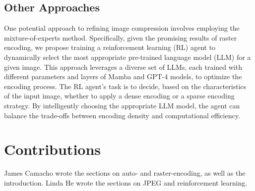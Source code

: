 \documentclass[11pt]{article}
\begin{document}
\subsection{Other Approaches}
One potential approach to refining image compression involves employing the mixture-of-experts method. Specifically, given the promising results of raster encoding, we propose training a reinforcement learning (RL) agent to dynamically select the most appropriate pre-trained language model (LLM) for a given image. This approach leverages a diverse set of LLMs, each trained with different parameters and layers of Mamba and GPT-4 models, to optimize the encoding process.
The RL agent's task is to decide, based on the characteristics of the input image, whether to apply a dense encoding or a sparse encoding strategy. By intelligently choosing the appropriate LLM model, the agent can balance the trade-offs between encoding density and computational efficiency. 

\section*{Contributions}
James Camacho wrote the sections on auto- and raster-encoding, as well as the introduction. Linda He wrote the sections on JPEG and reinforcement learning.

\newpage


\end{document}
